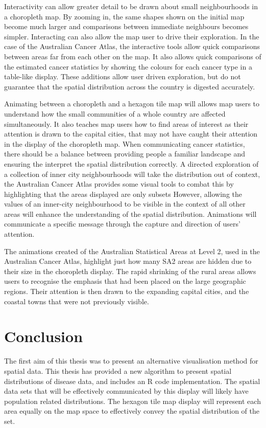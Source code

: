 \documentclass{monashthesis}
\begin{document}
Interactivity can allow greater detail to be drawn about small neighbourhoods in a choropleth map. By zooming in, the same shapes shown on the initial map become much larger and comparisons between immediate neighbours becomes simpler.
Interacting can also allow the map user to drive their exploration. In the case of the Australian Cancer Atlas, the interactive tools allow quick comparisons between areas far from each other on the map. It also allows quick comparisons of the estimated cancer statistics by showing the colours for each cancer type in a table-like display. These additions allow user driven exploration, but do not guarantee that the spatial distribution across the country is digested accurately.

Animating between a choropleth and a hexagon tile map will allows map users to understand how the small communities of a whole country are affected simultaneously. It also teaches map users how to find areas of interest as their attention is drawn to the capital cities, that may not have caught their attention in the display of the choropleth map. When communicating cancer statistics, there should be a balance between providing people a familiar landscape and ensuring the interpret the spatial distribution correctly. A directed exploration of a collection of inner city neighbourhoods will take the distribution out of context, the Australian Cancer Atlas provides some visual tools to combat this by highlighting that the areas displayed are only subsets However, allowing the values of an inner-city neighbourhood to be visible in the context of all other areas will enhance the understanding of the spatial distribution. Animations will communicate a specific message through the capture and direction of users' attention.

The animations created of the Australian Statistical Areas at Level 2, used in the Australian Cancer Atlas, highlight just how many SA2 areas are hidden due to their size in the choropleth display. The rapid shrinking of the rural areas allows users to recognise the emphasis that had been placed on the large geographic regions.
Their attention is then drawn to the expanding capital cities, and the coastal towns that were not previously visible.

\hypertarget{ch:conclusion}{%
\chapter{Conclusion}\label{ch:conclusion}}

The first aim of this thesis was to present an alternative visualisation method for spatial data. This thesis has provided a new algorithm to present spatial distributions of disease data, and includes an R code \autocite{R} implementation. The spatial data sets that will be effectively communicated by this display will likely have population related distributions. The hexagon tile map display will represent each area equally on the map space to effectively convey the spatial distribution of the set.
\end{document}
